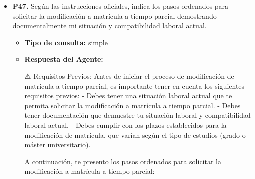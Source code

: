 \documentclass{article}
\begin{document}
\begin{itemize}
  \item \textbf{P47.} Según las instrucciones oficiales, indica los pasos ordenados para solicitar la modificación a matrícula a tiempo parcial demostrando documentalmente mi situación y compatibilidad laboral actual. \\
        \begin{itemize}
          \item \textbf{Tipo de consulta:} simple
          \item \textbf{Respuesta del Agente:}

                ⚠️ Requisitos Previos:
                Antes de iniciar el proceso de modificación de matrícula a tiempo parcial, es importante tener en cuenta los siguientes requisitos previos:
                - Debes tener una situación laboral actual que te permita solicitar la modificación a matrícula a tiempo parcial.
                - Debes tener documentación que demuestre tu situación laboral y compatibilidad laboral actual.
                - Debes cumplir con los plazos establecidos para la modificación de matrícula, que varían según el tipo de estudios (grado o máster universitario).

                A continuación, te presento los pasos ordenados para solicitar la modificación a matrícula a tiempo parcial:


\end{itemize}
\end{itemize}
\end{document}
